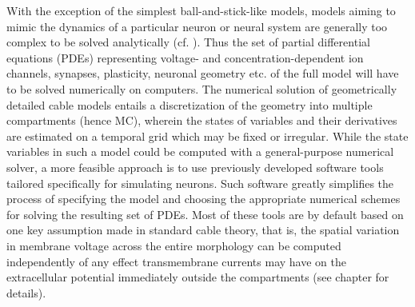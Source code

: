 With the exception of the simplest ball-and-stick-like models, models aiming to mimic the dynamics of a particular neuron or neural system are generally too complex to be solved analytically (cf. ). 
Thus the set of partial differential equations (PDEs) representing voltage- and concentration-dependent ion channels, synapses, plasticity, neuronal geometry etc. of the full model will have to be solved numerically on computers. The numerical solution of geometrically detailed cable models entails a discretization of the geometry into multiple compartments (hence MC), wherein the states of variables and their derivatives are estimated on a temporal grid which may be fixed or irregular. 
While the state variables in such a model could be computed with a general-purpose numerical solver, a more feasible approach is to use previously developed software tools tailored specifically for simulating neurons.
Such software greatly simplifies the process of specifying the model and choosing the appropriate numerical schemes for solving the resulting set of PDEs. 
Most of these tools are by default based on one key assumption made in standard cable theory, 
that is, the spatial variation in membrane voltage across the entire morphology can be computed independently of any effect transmembrane currents may have on the extracellular potential immediately outside the compartments (see chapter  for details).

